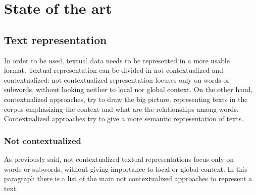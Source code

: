 \documentclass[\main/main.tex]{subfiles}
\begin{document}
\chapter{State of the art}

\section{Text representation}
In order to be used, textual data needs to be represented in a more usable format. Textual representation can be divided in not contextualized and contextualized: not contextualized representation focuses only on words or subwords, without looking neither to local nor global context. On the other hand, contextualized approaches, try to draw the big picture, representing texts in the corpus emphasizing the context and what are the relationships among words. Contextualized approaches try to give a more semantic representation of texts.
\subsection{Not contextualized}
As previously said, not contextualized textual representations focus only on words or subwords, without giving importance to local or global context. In this paragraph there is a list of the main not contextualized approaches to represent a text. 
\end{document}
